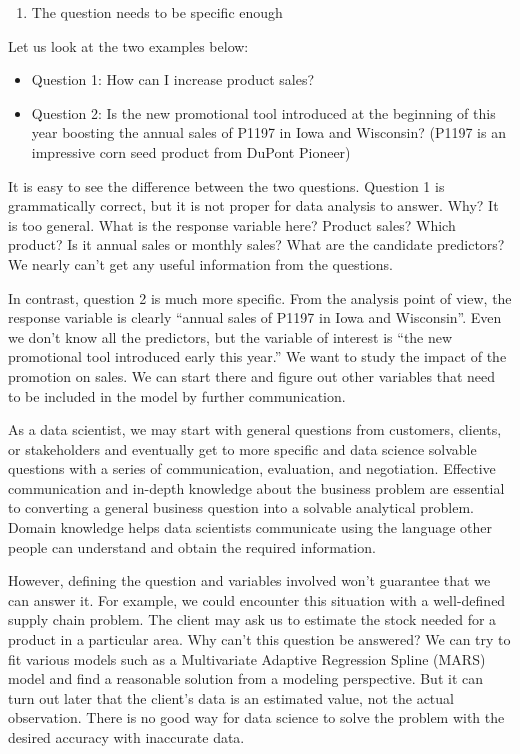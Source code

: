 \documentclass[
  12pt,
]{krantz}
\providecommand{\tightlist}{%
  \setlength{\itemsep}{0pt}\setlength{\parskip}{0pt}}
\begin{document}
\begin{enumerate}
\def\labelenumi{\arabic{enumi}.}
\tightlist
\item
  The question needs to be specific enough
\end{enumerate}

Let us look at the two examples below:

\begin{itemize}
\tightlist
\item
  Question 1: How can I increase product sales?
\item
  Question 2: Is the new promotional tool introduced at the beginning of this year boosting the annual sales of P1197 in Iowa and Wisconsin? (P1197 is an impressive corn seed product from DuPont Pioneer)
\end{itemize}

It is easy to see the difference between the two questions. Question 1 is grammatically correct, but it is not proper for data analysis to answer. Why? It is too general. What is the response variable here? Product sales? Which product? Is it annual sales or monthly sales? What are the candidate predictors? We nearly can't get any useful information from the questions.

In contrast, question 2 is much more specific. From the analysis point of view, the response variable is clearly ``annual sales of P1197 in Iowa and Wisconsin''. Even we don't know all the predictors, but the variable of interest is ``the new promotional tool introduced early this year.'' We want to study the impact of the promotion on sales. We can start there and figure out other variables that need to be included in the model by further communication.

As a data scientist, we may start with general questions from customers, clients, or stakeholders and eventually get to more specific and data science solvable questions with a series of communication, evaluation, and negotiation. Effective communication and in-depth knowledge about the business problem are essential to converting a general business question into a solvable analytical problem. Domain knowledge helps data scientists communicate using the language other people can understand and obtain the required information.

However, defining the question and variables involved won't guarantee that we can answer it. For example, we could encounter this situation with a well-defined supply chain problem. The client may ask us to estimate the stock needed for a product in a particular area. Why can't this question be answered? We can try to fit various models such as a Multivariate Adaptive Regression Spline (MARS) model and find a reasonable solution from a modeling perspective. But it can turn out later that the client's data is an estimated value, not the actual observation. There is no good way for data science to solve the problem with the desired accuracy with inaccurate data.
\end{document}
